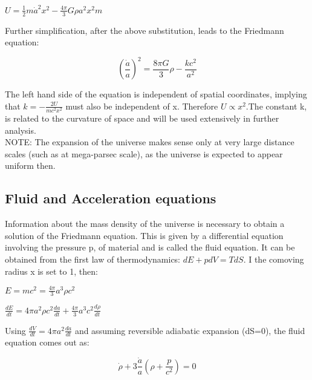 \documentclass{article}
\begin{document}
\begin{center}
    $U = {\frac{1}{2}}{m{\dot{a}^2}{x^2}}-\frac{4\pi}{3}G{\rho}{a^2}{x^2}m$
\end{center}

Further simplification, after the above substitution, leads to the Friedmann equation:

\begin{equation} \label{eq:1}
(\frac{\dot{a}}{a})^2 = \frac{8{\pi}G}{3}\rho -\frac{kc^2}{a^2}
\end{equation}

The left hand side of the equation is independent of spatial coordinates, implying that $k = -\frac{2U}{m{c^2}{x^2}}$ must also be independent of x. Therefore $U \propto {x^2}$.The constant k, is related to the curvature of space and will be used extensively in further analysis. \\

NOTE: The expansion of the universe makes sense only at very large distance scales (such as at mega-parsec scale), as the universe is expected to appear uniform then. 

\subsection{Fluid and Acceleration equations}
Information about the mass density of the universe is necessary to obtain a solution of the Friedmann equation. This is given by a differential equation involving the pressure p, of material and is called the fluid equation. It can be obtained from the first law of thermodynamics: $dE+pdV = TdS $. I the comoving radius x is set to 1, then:

\begin{center}
    $E = mc^2 = \frac{4\pi}{3}a^3{\rho}c^2$ \\
\end{center}
    
\begin{center}    
    $\frac{dE}{dt} = 4{\pi}a^2{\rho}c^2\frac{da}{dt}+\frac{4\pi}{3}a^3c^2\frac{d\rho}{dt}$
\end{center}

Using $\frac{dV}{dt} = 4{\pi}a^2\frac{da}{dt}$ and assuming reversible adiabatic expansion (dS=0), the fluid equation comes out as:

\begin{equation} \label{eq:2}
    \dot{\rho}+3\frac{\dot{a}}{a}(\rho+\frac{p}{c^2})=0
\end{equation}
\end{document}
